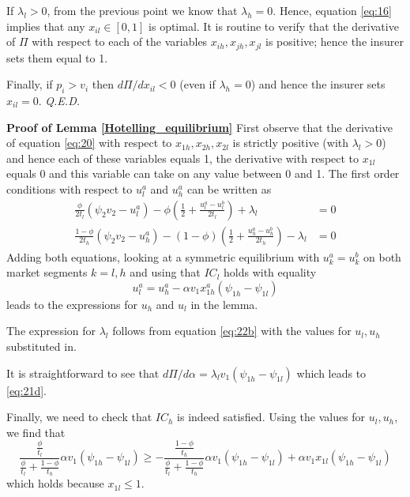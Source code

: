 \documentclass[a4paper,12pt]{article}
\newcommand{\qed}{\hspace*{\fill} {\em Q.E.D.}}
\begin{document}
If \(\lambda_l >0\), from the previous point we know that \(\lambda_h = 0\). Hence, equation \eqref{eq:16} implies that any \(x_{il} \in [0,1]\) is optimal. It is routine to verify that the derivative of \(\Pi\) with respect to each of the variables \(x_{ih},x_{jh},x_{jl}\) is positive; hence the insurer sets them equal to 1.

Finally, if \(p_i > v_i\) then \(d\Pi/dx_{il} <0\) (even if \(\lambda_h =0\)) and hence the insurer sets \(x_{il}=0\). 
 \qed


\textbf{Proof of Lemma \ref{Hotelling_equilibrium}}
First observe that the derivative of equation \eqref{eq:20} with respect to \(x_{1h},x_{2h},x_{2l}\) is strictly positive (with \(\lambda_l >0\)) and hence each of these variables equals 1, the derivative with respect to \(x_{1l}\) equals 0 and this variable can take on any value between 0 and 1. The first order conditions with respect to \(u_l^a\) and \(u_h^a\) can be written as
\begin{align}
\label{eq:22}
\frac{\phi}{2t_l}(\psi_2 v_2 - u_l^a) - \phi(\frac{1}{2} + \frac{u_l^a-u_l^b}{2t_l}) + \lambda_{l}  &=0 \\
\label{eq:22b}
\frac{1-\phi}{2t_h}(\psi_2 v_2 - u_h^a) - (1-\phi)(\frac{1}{2} + \frac{u_h^a-u_h^b}{2t_h}) - \lambda_{l}  &=0
\end{align}
Adding both equations, looking at a symmetric equilibrium with \(u_k^a=u_k^b\) on both market segments \(k=l,h\)  and using that \(IC_l\) holds with equality
\begin{equation}
\label{eq:23}
u_l^a = u_h^a - \alpha v_1 x_{1h}^a (\psi_{1h}-\psi_{1l})
\end{equation}
leads to the expressions for \(u_h\) and \(u_l\) in the lemma.

The expression for \(\lambda_{l}\) follows from equation \eqref{eq:22b} with the values for \(u_l,u_h\) substituted in.

It is straightforward to see that \(d\Pi/d\alpha = \lambda_{l} v_1 (\psi_{1h}-\psi_{1l})\) which leads to \eqref{eq:21d}.

Finally, we need to check that \(IC_h\) is indeed satisfied. Using the values for \(u_l,u_h\), we find that
\begin{equation}
\label{eq:24}
\frac{\frac{\phi}{t_l}}{\frac{\phi}{t_l}+\frac{1-\phi}{t_h}}\alpha v_1 (\psi_{1h}-\psi_{1l}) \geq -\frac{\frac{1-\phi}{t_h}}{\frac{\phi}{t_l}+\frac{1-\phi}{t_h}}\alpha v_1 (\psi_{1h}-\psi_{1l}) + \alpha v_1 x_{1l} (\psi_{1h}-\psi_{1l})
\end{equation}
which holds because \(x_{1l} \leq 1\).
\end{document}
